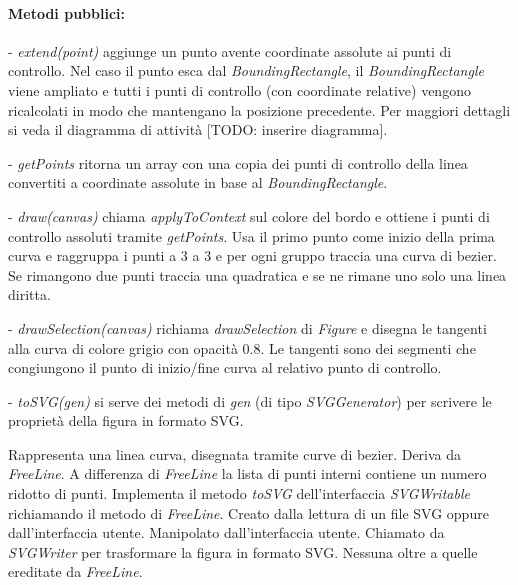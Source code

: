 \paragraph{Metodi pubblici:}
\begin{elencopuntato}[\normindent]
\item[-] \textit{extend(point)} aggiunge un punto avente coordinate assolute ai punti di controllo. Nel caso il punto esca dal \textit{BoundingRectangle}, il \textit{BoundingRectangle} viene ampliato e tutti i punti di controllo (con coordinate relative) vengono ricalcolati in modo che mantengano la posizione precedente. Per maggiori dettagli si veda il diagramma di attivit\`a [TODO: inserire diagramma].
\item[-] \textit{getPoints} ritorna un array con una copia dei punti di controllo della linea convertiti a coordinate assolute in base al \textit{BoundingRectangle}.
\item[-] \textit{draw(canvas)} chiama \textit{applyToContext} sul colore del bordo e ottiene i punti di controllo assoluti tramite \textit{getPoints}. Usa il primo punto come inizio della prima curva e raggruppa i punti a 3 a 3 e per ogni gruppo traccia una curva di bezier. Se rimangono due punti traccia una quadratica e se ne rimane uno solo una linea diritta.
\item[-] \textit{drawSelection(canvas)} richiama \textit{drawSelection} di \textit{Figure} e disegna le tangenti alla curva di colore grigio con opacit\`a 0.8. Le tangenti sono dei segmenti che congiungono il punto di inizio/fine curva al relativo punto di controllo.
\item[-] \textit{toSVG(gen)} si serve dei metodi di \textit{gen} (di tipo \textit{SVGGenerator}) per scrivere le propriet\`a della figura in formato SVG.
\end{elencopuntato}

Rappresenta una linea curva, disegnata tramite curve di bezier.
Deriva da \textit{FreeLine}. A differenza di \textit{FreeLine} la lista di punti interni contiene un numero ridotto di punti. Implementa il metodo \textit{toSVG} dell'interfaccia \textit{SVGWritable} richiamando il metodo di \textit{FreeLine}.
Creato dalla lettura di un file SVG oppure dall'interfaccia utente. Manipolato dall'interfaccia utente. Chiamato da \textit{SVGWriter} per trasformare la figura in formato SVG.
Nessuna oltre a quelle ereditate da \textit{FreeLine}.
